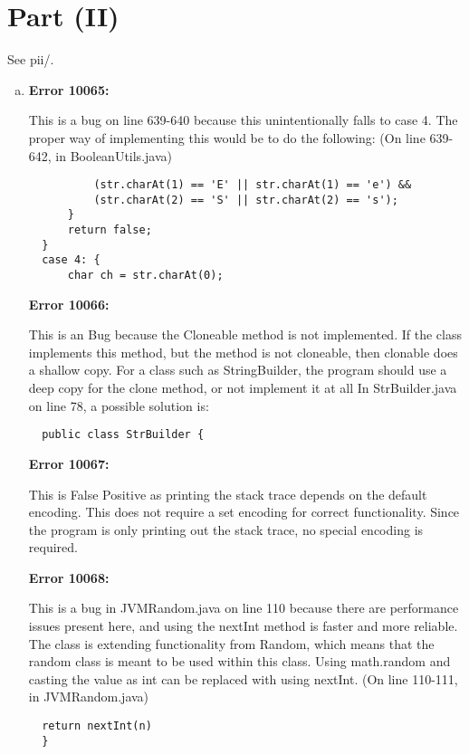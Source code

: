\documentclass{article}
\begin{document}
  \section*{Part (II)}
  See pii/.
  \begin{enumerate}[(a)]
  \item
  \textbf{Error 10065:}

  This is a bug on line 639-640 because this unintentionally falls to case 4.  The proper way of implementing this would be to do the following: (On line 639-642, in BooleanUtils.java)

  \begin{lstlisting}
          (str.charAt(1) == 'E' || str.charAt(1) == 'e') &&
          (str.charAt(2) == 'S' || str.charAt(2) == 's');
      }
      return false;
  }
  case 4: {
      char ch = str.charAt(0);
  \end{lstlisting}

  \textbf{Error 10066:}

  This is an Bug because the Cloneable method is not implemented. If the class implements this method, but the method is not cloneable, then clonable does a shallow copy. For a class such as StringBuilder, the program should use a deep copy for the clone method, or not implement it at all In StrBuilder.java on line 78, a possible solution is: 

  \begin{lstlisting}
  public class StrBuilder {
  \end{lstlisting}

  \textbf{Error 10067:}

  This is False Positive as printing the stack trace depends on the default encoding. This does not require a set encoding for correct functionality. Since the program is only printing out the stack trace, no special encoding is required.

  \textbf{Error 10068:}

  This is a bug in JVMRandom.java on line 110 because there are performance issues present here, and using the nextInt method is faster and more reliable. The class is extending functionality from Random, which means that the random class is meant to be used  within this class. Using math.random and casting the value as int can be replaced with using nextInt. (On line 110-111, in JVMRandom.java)

  \begin{lstlisting}
  return nextInt(n)
  }
  \end{lstlisting}


\end{enumerate}
\end{document}
